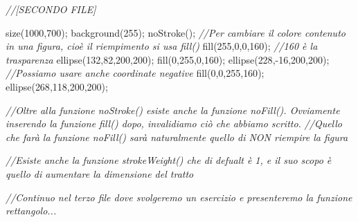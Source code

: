 \documentclass[
]{article}
\newenvironment{Shaded}{}{}
\newcommand{\CommentTok}[1]{\textcolor[rgb]{0.38,0.63,0.69}{\textit{#1}}}
\newcommand{\DecValTok}[1]{\textcolor[rgb]{0.25,0.63,0.44}{#1}}
\newcommand{\FunctionTok}[1]{\textcolor[rgb]{0.02,0.16,0.49}{#1}}
\newcommand{\OperatorTok}[1]{\textcolor[rgb]{0.40,0.40,0.40}{#1}}
\begin{document}
\begin{Shaded}
\begin{Highlighting}[]
\CommentTok{//[SECONDO FILE]}

\FunctionTok{size}\OperatorTok{(}\DecValTok{1000}\OperatorTok{,}\DecValTok{700}\OperatorTok{);}
\FunctionTok{background}\OperatorTok{(}\DecValTok{255}\OperatorTok{);}
\FunctionTok{noStroke}\OperatorTok{();}
\CommentTok{//Per cambiare il colore contenuto in una figura, cioè il riempimento si usa \textquotesingle{}fill()\textquotesingle{}}
\FunctionTok{fill}\OperatorTok{(}\DecValTok{255}\OperatorTok{,}\DecValTok{0}\OperatorTok{,}\DecValTok{0}\OperatorTok{,}\DecValTok{160}\OperatorTok{);} \CommentTok{//160 è la trasparenza}
\FunctionTok{ellipse}\OperatorTok{(}\DecValTok{132}\OperatorTok{,}\DecValTok{82}\OperatorTok{,}\DecValTok{200}\OperatorTok{,}\DecValTok{200}\OperatorTok{);}
\FunctionTok{fill}\OperatorTok{(}\DecValTok{0}\OperatorTok{,}\DecValTok{255}\OperatorTok{,}\DecValTok{0}\OperatorTok{,}\DecValTok{160}\OperatorTok{);}
\FunctionTok{ellipse}\OperatorTok{(}\DecValTok{228}\OperatorTok{,{-}}\DecValTok{16}\OperatorTok{,}\DecValTok{200}\OperatorTok{,}\DecValTok{200}\OperatorTok{);} \CommentTok{//Possiamo usare anche coordinate negative}
\FunctionTok{fill}\OperatorTok{(}\DecValTok{0}\OperatorTok{,}\DecValTok{0}\OperatorTok{,}\DecValTok{255}\OperatorTok{,}\DecValTok{160}\OperatorTok{);}    
\FunctionTok{ellipse}\OperatorTok{(}\DecValTok{268}\OperatorTok{,}\DecValTok{118}\OperatorTok{,}\DecValTok{200}\OperatorTok{,}\DecValTok{200}\OperatorTok{);}

\CommentTok{//Oltre alla funzione \textquotesingle{}noStroke()\textquotesingle{} esiste anche la funzione \textquotesingle{}noFill()\textquotesingle{}. Ovviamente inserendo la funzione \textquotesingle{}fill()\textquotesingle{} dopo, invalidiamo ciò che abbiamo scritto.}
\CommentTok{//Quello che farà la funzione noFill() sarà naturalmente quello di NON riempire la figura}

\CommentTok{//Esiste anche la funzione \textquotesingle{}strokeWeight()\textquotesingle{} che di defualt è 1, e il suo scopo è quello di aumentare la dimensione del tratto}

\CommentTok{//Continuo nel terzo file dove svolgeremo un esercizio e presenteremo la funzione rettangolo...}
\end{Highlighting}
\end{Shaded}
\end{document}
